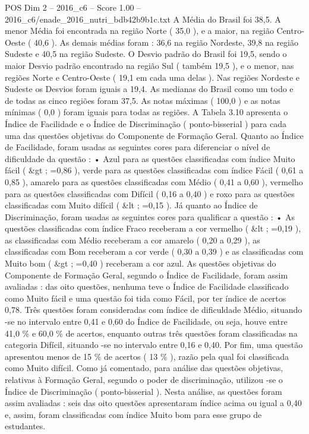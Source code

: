 \begin{textsample}{POS Dim 2 – 2016\_c6 – Score 1.00 – 2016\_c6/enade\_2016\_nutri\_bdb42b9b1c.txt}
A Média do Brasil foi 38,5.
A menor Média foi encontrada na região Norte ( 35,0 ), e a maior, na região Centro-Oeste ( 40,6 ).
As demais médias foram : 36,6 na região Nordeste, 39,8 na região Sudeste e 40,5 na região Sudeste.
O Desvio padrão do Brasil foi 19,5, sendo o maior Desvio padrão encontrado na região Sul ( também 19,5 ), e o menor, nas regiões Norte e Centro-Oeste ( 19,1 em cada uma delas ).
Nas regiões Nordeste e Sudeste os Desvios foram iguais a 19,4.
As medianas do Brasil como um todo e de todas as cinco regiões foram 37,5.
As notas máximas ( 100,0 ) e as notas mínimas ( 0,0 ) foram iguais para todas as regiões.
A Tabela 3.10 apresenta o Índice de Facilidade e o Índice de Discriminação ( ponto-bisserial ) para cada uma das questões objetivas do Componente de Formação Geral.
Quanto ao Índice de Facilidade, foram usadas as seguintes cores para diferenciar o nível de dificuldade da questão : • Azul para as questões classificadas com índice Muito fácil ( \&gt ; =0,86 ), verde para as questões classificadas com índice Fácil ( 0,61 a 0,85 ), amarelo para as questões classificadas com Médio ( 0,41 a 0,60 ), vermelho para as questões classificadas com Difícil ( 0,16 a 0,40 ) e roxo para as questões classificadas com Muito difícil ( \&lt ; =0,15 ).
Já quanto ao Índice de Discriminação, foram usadas as seguintes cores para qualificar a questão : • As questões classificadas com índice Fraco receberam a cor vermelho ( \&lt ; =0,19 ), as classificadas com Médio receberam a cor amarelo ( 0,20 a 0,29 ), as classificadas com Bom receberam a cor verde ( 0,30 a 0,39 ) e as classificadas com Muito bom ( \&gt ; =0,40 ) receberam a cor azul.
As questões objetivas do Componente de Formação Geral, segundo o Índice de Facilidade, foram assim avaliadas : das oito questões, nenhuma teve o Índice de Facilidade classificado como Muito fácil e uma questão foi tida como Fácil, por ter índice de acertos 0,78.
Três questões foram consideradas com índice de dificuldade Médio, situando -se no intervalo entre 0,41 e 0,60 do Índice de Facilidade, ou seja, houve entre 41,0 \% e 60,0 \% de acertos, enquanto outras três questões foram classificadas na categoria Difícil, situando -se no intervalo entre 0,16 e 0,40.
Por fim, uma questão apresentou menos de 15 \% de acertos ( 13 \% ), razão pela qual foi classificada como Muito difícil.
Como já comentado, para análise das questões objetivas, relativas à Formação Geral, segundo o poder de discriminação, utilizou -se o Índice de Discriminação ( ponto-bisserial ).
Nesta análise, as questões foram assim avaliadas : seis das oito questões apresentaram índice acima ou igual a 0,40 e, assim, foram classificadas com índice Muito bom para esse grupo de estudantes.

\end{textsample}
